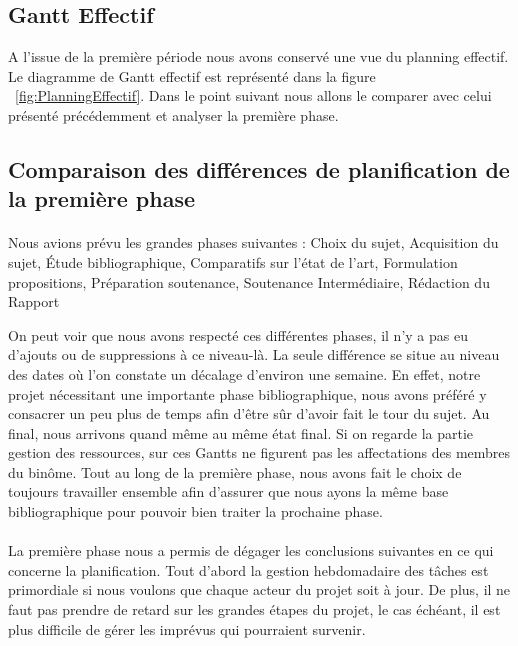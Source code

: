\documentclass[11pt, french]{report-rd-info}
\begin{document}
\subsection{Gantt Effectif}
A l'issue de la première période nous avons conservé une vue du planning effectif. Le diagramme de Gantt effectif est représenté dans la figure ~\ref{fig:PlanningEffectif}. Dans le point suivant nous allons le comparer avec celui présenté précédemment et analyser la première phase.

\subsection{Comparaison des différences de planification de la première phase}
\paragraph*{}
Nous avions prévu les grandes phases suivantes : Choix du sujet, Acquisition du sujet, Étude bibliographique, Comparatifs sur l'état de l'art, Formulation propositions, Préparation soutenance, Soutenance Intermédiaire, Rédaction du Rapport

On peut voir que nous avons respecté ces différentes phases, il n’y a pas eu d’ajouts ou de suppressions à ce niveau-là. La seule différence se situe au niveau des dates où l’on constate un décalage d’environ une semaine. En effet, notre projet nécessitant une importante phase bibliographique, nous avons préféré y consacrer un peu plus de temps afin d’être sûr d’avoir fait le tour du sujet. Au final, nous arrivons quand même au même état final. Si on regarde la partie gestion des ressources, sur ces Gantts ne figurent pas les affectations des membres du binôme. Tout au long de la première phase, nous avons fait le choix de toujours travailler ensemble afin d’assurer que nous ayons la même base bibliographique pour pouvoir bien traiter la prochaine phase.

\paragraph*{}
La première phase nous a permis de dégager les conclusions suivantes en ce qui concerne la planification. Tout d’abord la gestion hebdomadaire des tâches est primordiale si nous voulons que chaque acteur du projet soit à jour. De plus, il ne faut pas prendre de retard sur les grandes étapes du projet, le cas échéant, il est plus difficile de gérer les imprévus qui pourraient survenir. 
\end{document}

